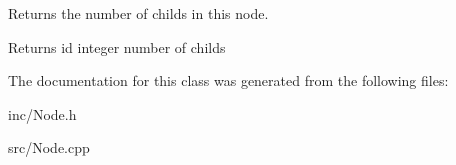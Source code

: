 Returns the number of childs in this node. 

\begin{DoxyReturn}{Returns}
id integer number of childs 
\end{DoxyReturn}


The documentation for this class was generated from the following files\+:\begin{DoxyCompactItemize}
\item 
inc/Node.\+h\item 
src/Node.\+cpp\end{DoxyCompactItemize}
